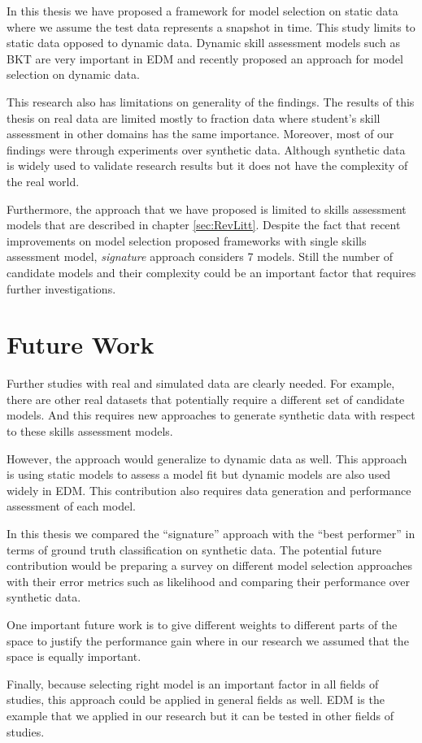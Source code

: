In this thesis we have proposed a framework for model selection on static data where we assume the test data represents a snapshot in time. This study limits to static data opposed to dynamic data. Dynamic skill assessment models such as BKT are very important in EDM and recently \citet{Rosenberg2015} proposed an approach for model selection on dynamic data. 

This research also has limitations on generality of the findings. The results of this thesis on real data are limited mostly to fraction data where student's skill assessment in other domains has the same importance. Moreover, most of our findings were through experiments over synthetic data. Although synthetic data is widely used to validate research results but it does not have the complexity of the real world. 

Furthermore, the approach that we have proposed is limited to skills assessment models that are described in chapter \ref{sec:RevLitt}. Despite the fact that recent improvements on model selection proposed frameworks with single skills assessment model, \textit{signature} approach considers 7 models. Still the number of candidate models and their complexity could be an important factor that requires further investigations.

\section{Future Work}

Further studies with real and simulated data are clearly needed. For example, there are other real datasets that potentially require a different set of candidate models. And this requires new approaches to generate synthetic data with respect to these skills assessment models.

However, the approach would generalize to dynamic data as well. This approach is using static models to assess a model fit but dynamic models are also used widely in EDM. This contribution also requires data generation and performance assessment of each model.

In this thesis we compared the ``signature'' approach with the ``best performer'' in terms of ground truth classification on synthetic data. The potential future contribution would be preparing a survey on different model selection approaches with their error metrics such as likelihood and comparing their performance over synthetic data.

One important future work is to give different weights to different parts of the space to justify the performance gain where in our research we assumed that the space is equally important.

Finally, because selecting right model is an important factor in all fields of studies, this approach could be applied in general fields as well. EDM is the example that we applied in our research but it can be tested in other fields of studies.

